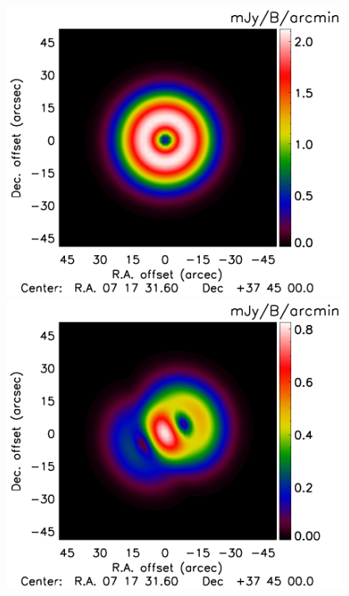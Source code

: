 \documentclass[twocolumn,traditabstract]{aa}
\begin{document}
\begin{figure}[h]
\includegraphics[trim=0cm 0.7cm 0cm 0cm, clip=true, totalheight=3.4cm]{Figure/PSalone_GGM_PointSource_15_15_45.pdf}
\includegraphics[trim=0cm 0.7cm 0cm 0cm, clip=true, totalheight=3.4cm]{Figure/PSalone_GGM_PointSourceResidual_15_15_45.pdf}

\end{figure}
\end{document}
